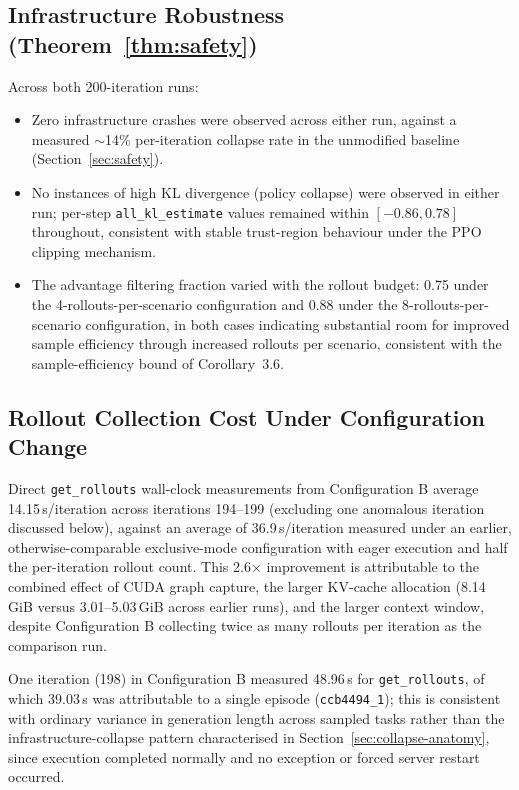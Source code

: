 \documentclass[11pt]{article}
\begin{document}
\subsection{Infrastructure Robustness (Theorem~\ref{thm:safety})}

Across both 200-iteration runs:
\begin{itemize}
\item Zero infrastructure crashes were observed across either run, against a
measured $\sim$14\% per-iteration collapse rate in the unmodified baseline
(Section~\ref{sec:safety}).
\item No instances of high KL divergence (policy collapse) were observed in
either run; per-step \texttt{all\_kl\_estimate} values remained within
$[-0.86, 0.78]$ throughout, consistent with stable trust-region behaviour
under the PPO clipping mechanism.
\item The advantage filtering fraction varied with the rollout budget: 0.75
under the 4-rollouts-per-scenario configuration and 0.88 under the
8-rollouts-per-scenario configuration, in both cases indicating substantial
room for improved sample efficiency through increased rollouts per scenario,
consistent with the sample-efficiency bound of Corollary~3.6.
\end{itemize}

\subsection{Rollout Collection Cost Under Configuration Change}

Direct \texttt{get\_rollouts} wall-clock measurements from Configuration B
average 14.15\,s/iteration across iterations 194--199 (excluding one
anomalous iteration discussed below), against an average of 36.9\,s/iteration
measured under an earlier, otherwise-comparable exclusive-mode configuration
with eager execution and half the per-iteration rollout count. This 2.6$\times$
improvement is attributable to the combined effect of CUDA graph capture, the
larger KV-cache allocation (8.14\,GiB versus 3.01--5.03\,GiB across earlier
runs), and the larger context window, despite Configuration B collecting
twice as many rollouts per iteration as the comparison run.

One iteration (198) in Configuration B measured 48.96\,s for
\texttt{get\_rollouts}, of which 39.03\,s was attributable to a single episode
(\texttt{ccb4494\_1}); this is consistent with ordinary variance in
generation length across sampled tasks rather than the infrastructure-collapse
pattern characterised in Section~\ref{sec:collapse-anatomy}, since execution
completed normally and no exception or forced server restart occurred.
\end{document}
